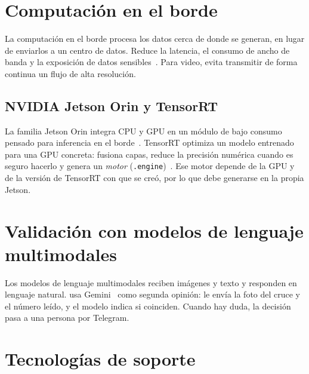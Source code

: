 \section{Computación en el borde}

La computación en el borde procesa los datos cerca de donde se generan, en
lugar de enviarlos a un centro de datos. Reduce la latencia, el consumo de
ancho de banda y la exposición de datos sensibles~\cite{shi2016edge}. Para
video, evita transmitir de forma continua un flujo de alta resolución.

\subsection{NVIDIA Jetson Orin y TensorRT}

La familia Jetson Orin integra CPU y GPU en un módulo de bajo consumo
pensado para inferencia en el borde~\cite{jetson}. TensorRT optimiza un
modelo entrenado para una GPU concreta: fusiona capas, reduce la precisión
numérica cuando es seguro hacerlo y genera un \emph{motor}
(\texttt{.engine})~\cite{tensorrt}. Ese motor depende de la GPU y de la
versión de TensorRT con que se creó, por lo que debe generarse en la propia
Jetson.

\section{Validación con modelos de lenguaje multimodales}

Los modelos de lenguaje multimodales reciben imágenes y texto y responden
en lenguaje natural. \saru{} usa Gemini~\cite{gemini} como segunda opinión:
le envía la foto del cruce y el número leído, y el modelo indica si
coinciden. Cuando hay duda, la decisión pasa a una persona por Telegram.

\section{Tecnologías de soporte}


